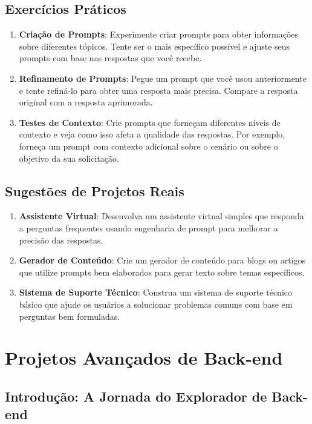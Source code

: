 \documentclass[a4paper,12pt]{book}
\begin{document}
\section{Exercícios Práticos}

\begin{enumerate}[label=\arabic*.]
    \item \textbf{Criação de Prompts}: Experimente criar prompts para obter informações sobre diferentes tópicos. Tente ser o mais específico possível e ajuste seus prompts com base nas respostas que você recebe.
    \item \textbf{Refinamento de Prompts}: Pegue um prompt que você usou anteriormente e tente refiná-lo para obter uma resposta mais precisa. Compare a resposta original com a resposta aprimorada.
    \item \textbf{Testes de Contexto}: Crie prompts que forneçam diferentes níveis de contexto e veja como isso afeta a qualidade das respostas. Por exemplo, forneça um prompt com contexto adicional sobre o cenário ou sobre o objetivo da sua solicitação.
\end{enumerate}

\section{Sugestões de Projetos Reais}

\begin{enumerate}[label=\arabic*.]
    \item \textbf{Assistente Virtual}: Desenvolva um assistente virtual simples que responda a perguntas frequentes usando engenharia de prompt para melhorar a precisão das respostas.
    \item \textbf{Gerador de Conteúdo}: Crie um gerador de conteúdo para blogs ou artigos que utilize prompts bem elaborados para gerar texto sobre temas específicos.
    \item \textbf{Sistema de Suporte Técnico}: Construa um sistema de suporte técnico básico que ajude os usuários a solucionar problemas comuns com base em perguntas bem formuladas.
\end{enumerate}

\chapter{Projetos Avançados de Back-end}
\section{Introdução: A Jornada do Explorador de Back-end}
\end{document}
